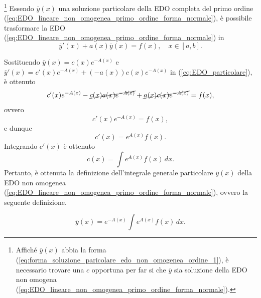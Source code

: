 \footnote{Affiché $\overline{y}(x)$ abbia la forma (\ref{eq:forma_soluzione_paricolare_edo_non_omogenea_ordine_1}), è necessario trovare una $c$ opportuna per far si che $\overline{y}$ sia soluzione della EDO non omogena (\ref{eq:EDO_lineare_non_omogenea_primo_ordine_forma_normale}).} Essendo $\overline{y}(x)$ una soluzione particolare della EDO completa del primo ordine (\ref{eq:EDO_lineare_non_omogenea_primo_ordine_forma_normale}), è possibile trasformare la EDO (\ref{eq:EDO_lineare_non_omogenea_primo_ordine_forma_normale}) in 
\begin{equation}\label{eq:EDO_particolare}
    \overline{y}'(x)+a(x)\overline{y}(x)=f(x),\quad x\in[a,b].
\end{equation}

Sostituendo $\overline{y}(x)=c(x)e^{-A(x)}$ e $\overline{y}'(x) = c'(x)e^{-A(x)}+(-a(x))c(x)e^{-A(x)}$ in (\ref{eq:EDO_particolare}), è ottenuto
\begin{equation*}
    c'(x)e^{-A(x)}-\cancel{c(x)a(x)e^{-A(x)}}+\cancel{a(x)c(x)e^{-A(x)}}=f(x),
\end{equation*}
ovvero
\begin{equation*}
    c'(x)e^{-A(x)} = f(x),
\end{equation*}
e dunque
\begin{equation*}
    c'(x)=e^{A(x)}f(x).
\end{equation*}
Integrando $c'(x)$ è ottenuto
\begin{equation*}
    c(x)=\int e^{A(x)} f(x)\, dx.
\end{equation*}
Pertanto, è ottenuta la definizione dell'integrale generale particolare $\overline{y}(x)$ della EDO non omogenea (\ref{eq:EDO_lineare_non_omogenea_primo_ordine_forma_normale}), ovvero la seguente definizione.
\begin{definition}
    \begin{equation}\label{eq:integrale_particolare_EDO_completa}
        \overline{y}(x)=e^{-A(x)}\int e^{A(x)} f(x)\, dx.
    \end{equation}
\end{definition}


